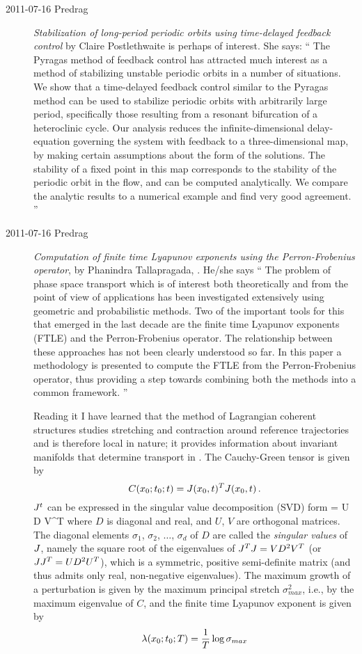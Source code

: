 \begin{description}
\item[2011-07-16 Predrag]
{\em Stabilization of long-period periodic orbits
    using time-delayed feedback control} by Claire
    Postlethwaite
is perhaps of interest. She says: ``
The Pyragas method of feedback control has attracted much interest as a
method of stabilizing unstable periodic orbits in a number of situations.
We show that a time-delayed feedback control similar to the Pyragas
method can be used to stabilize periodic orbits with arbitrarily large
period, specifically those resulting from a resonant bifurcation of a
heteroclinic cycle. Our analysis reduces the infinite-dimensional
delay-equation governing the system with feedback to a three-dimensional
map, by making certain assumptions about the form of the solutions. The
stability of a fixed point in this map corresponds to the stability of
the periodic orbit in the flow, and can be computed analytically. We
compare the analytic results to a numerical example and find very good
agreement.
''

\item[2011-07-16 Predrag]
{\em Computation of finite time {Lyapunov} exponents using the
{Perron-Frobenius} operator}, by Phanindra Tallapragada,
. He/she says
``
    The problem of phase space transport which is of interest both
    theoretically and from the point of view of applications has been
    investigated extensively using geometric and probabilistic methods.
    Two of the important tools for this that emerged in the last decade
    are the finite time Lyapunov exponents (FTLE) and the
    Perron-Frobenius operator. The relationship between these approaches
    has not been clearly understood so far. In this paper a methodology
    is presented to compute the FTLE from the Perron-Frobenius operator,
    thus providing a step towards combining both the methods into a
    common framework.
''

                                                    \toCB
Reading it I have learned that the method of Lagrangian coherent
structures studies stretching and contraction around reference
trajectories and is therefore local in nature; it provides information
about invariant manifolds that determine transport in \statesp. The
Cauchy-Green tensor is given by
\[
C({x_0}; t_0; t) = J({x_0},t)^T J({x_0},t)
\,.
\]
$J^t$ can be expressed in the singular value decomposition (SVD) form
\beq
\jMps = {U} {D}  {V}^T
where ${D}$ is diagonal and real, and ${U}$, ${V}$ are orthogonal
matrices. The diagonal elements
$\sigma_{1}$, $\sigma_{2}$, $\dots$, $\sigma_{d}$ of ${D}$ are called the
\emph{singular values} of $\jMps$, namely the square root of the
eigenvalues of $\jMps^{T}\jMps = {V}{D}^{2}{V}^T$ (or $\jMps\jMps^{T} =
{U}{D}^{2}{U}^T$), which is a symmetric, positive semi-definite matrix
(and thus admits only real, non-negative eigenvalues).
The maximum growth of a
perturbation is given by the maximum principal stretch
\(
\sigma_{max}^2
\), i.e., by the maximum eigenvalue of $C$,
and the finite time Lyapunov exponent is given by
\[
\Lyap(\xInit; t_0; T) = \frac{1}{T} \log \sigma_{max}
\]


\end{description}
